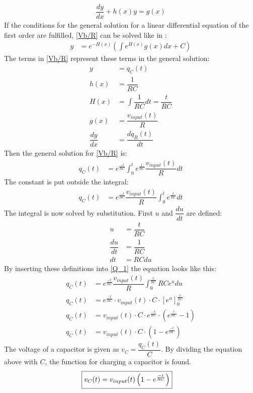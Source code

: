 \begin{align*}
\dfrac{dy}{dx}+h(x)y=g(x)
\end{align*}
If the conditions for the general solution for a linear differential equation of the first order are fulfilled, \eqref{Vb/R} can be solved like in :
\begin{align*}
y&=e^{-H(x)}\left(\int e^{H(x)}g(x)dx+C\right)
\end{align*}
The terms in \eqref{Vb/R} represent these terms in the general solution:
\begin{align*}
y &= q_C(t)
\\
h(x) &= \dfrac{1}{RC}
\\
H(x) &= \int \dfrac{1}{RC}dt=\dfrac{t}{RC}
\\
g(x) &= \dfrac{v_{input}(t)}{R}
\\
\dfrac{dy}{dx} &= \dfrac{dq_R(t)}{dt}
\end{align*}
Then the general solution for \eqref{Vb/R} is:
\begin{align*}
q_C(t) &= e^{\frac{-t}{RC}}\int_{0}^{t}e^{\frac{t}{RC}}\dfrac{v_{input}(t)}{R}dt
\end{align*}
The constant is put outside the integral:
\begin{align}
q_C(t) &= e^{\frac{-t}{RC}}\dfrac{v_{input}(t)}{R}\int_{0}^{t}e^{\frac{t}{RC}}dt \label{Q_1}
\end{align}
The integral is now solved by substitution. First $u$ and $\dfrac{du}{dt}$ are defined:
\begin{align*}
u &= \dfrac{t}{RC}
\\
\dfrac{du}{dt}&=\dfrac{1}{RC}
\\
dt &=RC du
\end{align*} 
By inserting these definitions into \eqref{Q_1} the equation looks like this:
\begin{align*}
q_C(t) &= e^{\frac{-t}{RC}}\dfrac{v_{input}(t)}{R}\int_{0}^{\frac{t}{RC}}RCe^u du
\\
q_C(t) &= e^{\frac{-t}{RC}}\cdot v_{input}(t)\cdot C\cdot \left[e^u\right]_{0}^{\frac{t}{RC}}
\\
q_C(t) &= v_{input}(t) \cdot C\cdot e^{\frac{-t}{RC}}\cdot\left(e^{\frac{t}{RC}}-1\right)
\\
q_C(t) &= v_{input}(t) \cdot C \cdot \left(1-e^{\frac{-t}{RC}}\right)
\end{align*} 
The voltage of a capacitor is given as $v_C=\dfrac{q_C(t)}{C}$. By dividing the equation above with $C$, the function for charging a capacitor is found.
\begin{align}
\label{V_up}
\Aboxed{
v_C(t)=v_{input}(t)\left(1-e^{\frac{-t}{RC}}\right)
}
\end{align}
